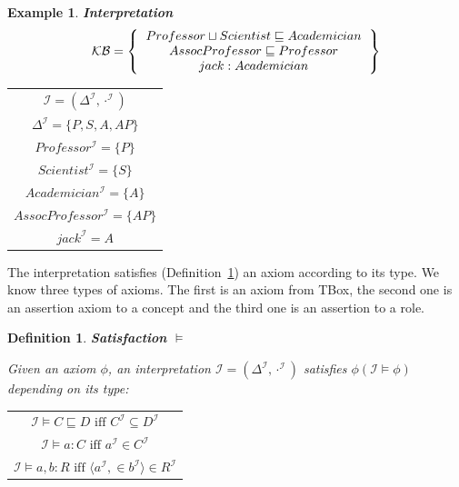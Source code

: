 \documentclass[12pt,a4paper]{article}
\newtheorem{definition}{Definition}[subsection]
\newtheorem{example}{Example}[subsection]
\begin{document}
\begin{example}{\textbf{Interpretation}}
	\[ 
	\mathcal{KB} = \left\{
	\begin{tabular}{c c}
	$Professor \sqcup Scientist \sqsubseteq Academician$ \\
	$AssocProfessor \sqsubseteq Professor$ \\
	$jack : Academician$ \\
	\end{tabular}
	\right \}
	\]
	
	\begin{table}[H]
		\centering
		\begin{tabular}{c}
			$ \mathcal{I} = (\Delta ^{\mathcal{I}}, \cdot^{\mathcal{I}}) $ \\
			\addlinespace[0.4cm]
			$ \Delta ^{\mathcal{I}} = \{ P,S,A,AP \} $ \\
			\addlinespace[0.4cm]
			$ Professor^{\mathcal{I}} = \{P\} $ \\
			\addlinespace[0.4cm]
			$ Scientist^{\mathcal{I}} = \{S\} $ \\
			\addlinespace[0.4cm]
			$ Academician^{\mathcal{I}} = \{A\} $ \\
			\addlinespace[0.4cm]
			$ AssocProfessor^{\mathcal{I}} = \{AP\} $ \\
			\addlinespace[0.4cm]
			$ jack^{\mathcal{I}} = A $
		\end{tabular}
	\end{table}

\end{example}

The interpretation satisfies (Definition~\ref{def:satisfaction}) an axiom according to its type. We know three types of axioms. The first is an axiom from TBox, the second one is an assertion axiom to a concept and the third one is an assertion to a role.

\newpage
\begin{definition}{\textbf{Satisfaction $\models$}}
	\label{def:satisfaction}

	Given an axiom $\phi$, an interpretation $\mathcal{I} = (\Delta^{\mathcal{I}}, \cdot ^{\mathcal{I}})$ satisfies $\phi (\mathcal{I} \models \phi)$ depending on its type:
	
	\begin{table}[H]
		\centering
		\begin{tabular}{c}
			$ \mathcal{I} \models C \sqsubseteq D \text{ iff } C^{\mathcal{I}} \subseteq D^{\mathcal{I}} $ \\
			\addlinespace[0.4cm]
			$ \mathcal{I} \models a:C \text{ iff } a^{\mathcal{I}} \in C^{\mathcal{I}} $ \\
			\addlinespace[0.4cm]
			$ \mathcal{I} \models a,b:R \text{ iff } \langle a^{\mathcal{I}}, \in b^{\mathcal{I}} \rangle \in R^{\mathcal{I}} $
		\end{tabular}
	\end{table}

\end{definition}
\end{document}
